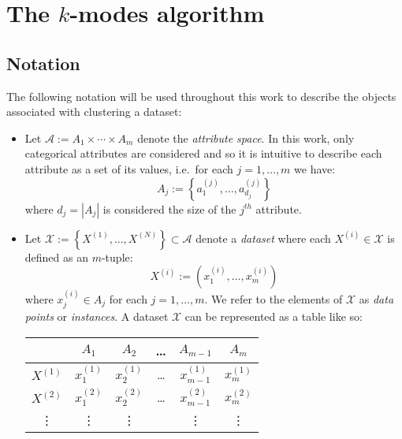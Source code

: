 \section{The \(k\)-modes algorithm}\label{sec:kmodes}

\subsection{Notation}\label{subsec:notation}

The following notation will be used throughout this work to describe the objects
associated with clustering a dataset:

\begin{itemize}
    \item Let \(\mathcal{A} := A_1 \times \cdots \times A_m\) denote the
        \textit{attribute space}. In this work, only categorical attributes are
        considered and so it is intuitive to describe each attribute as a set of
        its values, i.e.\ for each \(j = 1, \ldots, m\) we have:
        \[
            A_j := \left\{a_1^{(j)}, \ldots, a_{d_j}^{(j)}\right\}
        \]
        where \(d_j = |A_j|\) is considered the size of the \(j^{th}\)
        attribute.
    \item Let \(\mathcal{X} := \left\{X^{(1)}, \ldots, X^{(N)}\right\} \subset
        \mathcal{A}\) denote a \textit{dataset} where each \(X^{(i)} \in
        \mathcal{X}\) is defined as an \(m\)-tuple:
        \[
            X^{(i)} := \left(x_1^{(i)}, \ldots, x_m^{(i)}\right)
        \]
        where \(x_j^{(i)} \in A_j\) for each \(j = 1, \ldots, m\). We refer to
        the elements of \(\mathcal{X}\) as \textit{data points} or
        \textit{instances}. A dataset \(\mathcal{X}\) can be represented as a
        table like so:
        \begin{table}[H]
        \centering
        \begin{tabular}{cccccc}
            {} & \(A_1\) & \(A_2\) & \quad \ldots \quad & \(A_{m-1}\) & \(A_m\)
            \\
            \midrule
            \(X^{(1)}\) & \(x_1^{(1)}\) & \(x_2^{(1)}\) & \quad \ldots \quad & 
            \(x_{m-1}^{(1)}\) & \(x_m^{(1)}\)
            \\
            \(X^{(2)}\) & \(x_1^{(2)}\) & \(x_2^{(2)}\) & \quad \ldots \quad &
            \(x_{m-1}^{(2)}\) & \(x_m^{(2)}\)
            \\
            \vdots & \vdots & \vdots & {} & \vdots & \vdots
            \\

\end{tabular}
\end{table}
\end{itemize}
